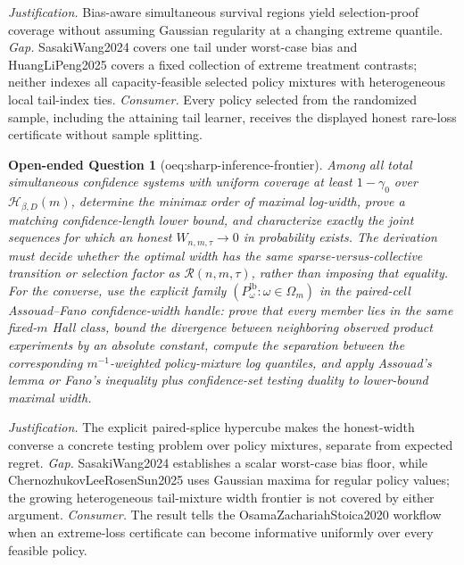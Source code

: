 \documentclass{article}
\newtheorem{openendedquestion}{Open-ended Question}
\begin{document}
\par\smallskip\noindent \textit{Justification.} Bias-aware simultaneous survival regions yield selection-proof coverage without assuming Gaussian regularity at a changing extreme quantile. \textit{Gap.} SasakiWang2024 covers one tail under worst-case bias and HuangLiPeng2025 covers a fixed collection of extreme treatment contrasts; neither indexes all capacity-feasible selected policy mixtures with heterogeneous local tail-index ties. \textit{Consumer.} Every policy selected from the randomized sample, including the attaining tail learner, receives the displayed honest rare-loss certificate without sample splitting.

\begin{openendedquestion}[oeq:sharp-inference-frontier]\label{oeq:sharp-inference-frontier}
Among all total simultaneous confidence systems with uniform coverage at least \(1-\gamma_0\) over \(\mathcal H_{\beta,D}(m)\), determine the minimax order of maximal log-width, prove a matching confidence-length lower bound, and characterize exactly the joint sequences for which an honest \(W_{n,m,\tau}\to0\) in probability exists. The derivation must decide whether the optimal width has the same sparse-versus-collective transition or selection factor as \(\mathcal R(n,m,\tau)\), rather than imposing that equality. For the converse, use the explicit family \((P^{\mathrm{lb}}_{\omega}:\omega\in\Omega_m)\) in the paired-cell Assouad--Fano confidence-width handle: prove that every member lies in the same fixed-\(m\) Hall class, bound the divergence between neighboring observed product experiments by an absolute constant, compute the separation between the corresponding \(m^{-1}\)-weighted policy-mixture log quantiles, and apply Assouad's lemma or Fano's inequality plus confidence-set testing duality to lower-bound maximal width.
\end{openendedquestion}
\par\smallskip\noindent \textit{Justification.} The explicit paired-splice hypercube makes the honest-width converse a concrete testing problem over policy mixtures, separate from expected regret. \textit{Gap.} SasakiWang2024 establishes a scalar worst-case bias floor, while ChernozhukovLeeRosenSun2025 uses Gaussian maxima for regular policy values; the growing heterogeneous tail-mixture width frontier is not covered by either argument. \textit{Consumer.} The result tells the OsamaZachariahStoica2020 workflow when an extreme-loss certificate can become informative uniformly over every feasible policy.
\end{document}
